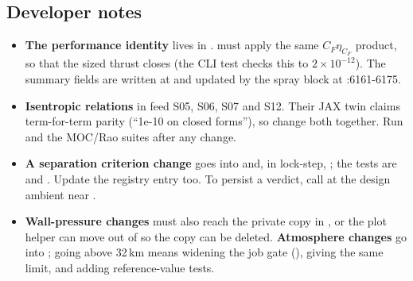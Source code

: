 \subsection{Developer notes}

\begin{itemize}
\item \textbf{The performance identity} lives in .  must apply the same $C_{F}\eta_{C_F}$ product, so that the sized thrust closes (the CLI test checks this to $2\times10^{-12}$). The summary fields are written at  and updated by the spray block at :6161-6175.
\item \textbf{Isentropic relations} in  feed S05, S06, S07 and S12. Their JAX twin  claims term-for-term parity (``1e-10 on closed forms''), so change both together. Run  and the MOC/Rao suites after any change.
\item \textbf{A separation criterion change} goes into  and, in lock-step, ; the tests are  and . Update the registry entry  too. To persist a verdict, call  at the design ambient near .
\item \textbf{Wall-pressure changes} must also reach the private copy in , or the plot helper can move out of  so the copy can be deleted. \textbf{Atmosphere changes} go into ; going above 32\,km means widening the job gate (), giving  the same limit, and adding reference-value tests.
\end{itemize}
